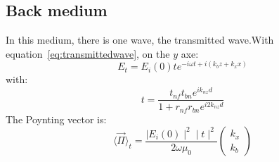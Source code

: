 \subsection{Back medium}
In this medium, there is one wave, the transmitted wave.With equation~\eqref{eq:transmittedwave}, on the $y$ axe:\\
\begin{equation*}
E_t = E_i(0)te^{-i\omega t+i(k_bz+k_xx)}
\end{equation*}
with:
$$
t = \frac{t_{nf}t_{bn}e^{ik_{nz}d}}{1+r_{nf}r_{bn}e^{i2k_{nz}d}}
$$
The Poynting vector is:\\
$$
\langle \vec{\Pi} \rangle _t = \frac{\mid E_i(0)\mid ^2\mid t\mid ^2}{2\omega \mu_0}
\begin{pmatrix}
k_x\\
k_b
\end{pmatrix}
$$
